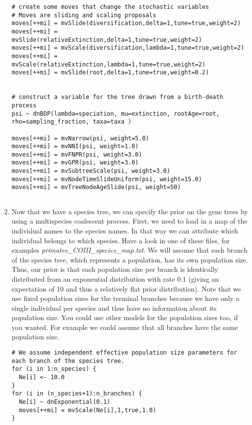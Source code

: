 \begin{enumerate}
{\begin{snugshade*}
\begin{lstlisting}
# create some moves that change the stochastic variables
# Moves are sliding and scaling proposals
moves[++mi] = mvSlide(diversification,delta=1,tune=true,weight=2)
moves[++mi] = mvSlide(relativeExtinction,delta=1,tune=true,weight=2)
moves[++mi] = mvScale(diversification,lambda=1,tune=true,weight=2)
moves[++mi] = mvScale(relativeExtinction,lambda=1,tune=true,weight=2)
moves[++mi] = mvSlide(root,delta=1,tune=true,weight=0.2)


# construct a variable for the tree drawn from a birth-death process
psi ~ dnBDP(lambda=speciation, mu=extinction, rootAge=root, rho=sampling_fraction, taxa=taxa )

moves[++mi] = mvNarrow(psi, weight=5.0)
moves[++mi] = mvNNI(psi, weight=1.0)
moves[++mi] = mvFNPR(psi, weight=3.0)
moves[++mi] = mvGPR(psi, weight=3.0)
moves[++mi] = mvSubtreeScale(psi, weight=3.0)
moves[++mi] = mvNodeTimeSlideUniform(psi, weight=15.0)
moves[++mi] = mvTreeNodeAgeSlide(psi, weight=50)


\end{lstlisting}
\end{snugshade*}}
\item Now that we have a species tree, we can specify the prior on the gene trees by using a multispecies coalescent process.
First, we need to load in a map of the individual names to the species names.
In that way we can attribute which individual belongs to which species.
Have a look in one of these files, for examples \textit{primates\_COIII\_species\_map.txt}.
We will assume that each branch of the species tree, which represents a population, has its own population size.
Thus, our prior is that each population size per branch is identically distributed from an exponential distribution with rate 0.1 (giving an expectation of 10 and thus a relatively flat prior distribution).
Note that we use fixed population sizes for the terminal branches because we have only a single individual per species and thus have no information about its population size.
You could use other models for the population sizes too, if you wanted.
For example we could assume that all branches have the same population size.
{\tt \begin{snugshade*}
\begin{lstlisting}
# We assume independent effective population size parameters for each branch of the species tree.
for (i in 1:n_species) {
  Ne[i] <- 10.0
}
for (i in (n_species+1):n_branches) {
  Ne[i] ~ dnExponential(0.1)
  moves[++mi] = mvScale(Ne[i],1,true,1.0)
}


\end{lstlisting}
\end{snugshade*}}
\end{enumerate}
